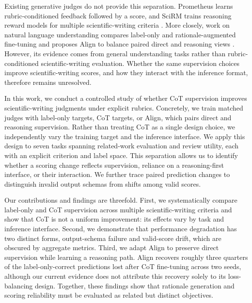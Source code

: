Existing generative judges do not provide this separation. Prometheus learns
rubric-conditioned feedback followed by a score, and SciRM trains reasoning
reward models for multiple scientific-writing criteria
\citep{kim-etal-2024-prometheus-iclr,sahinuc-etal-2026-reward}. More closely,
work on natural language understanding compares label-only and
rationale-augmented fine-tuning and proposes Align to balance paired direct and
reasoning views \citep{shi-etal-2025-rationales-nlu}. However, its evidence
comes from general understanding tasks rather than rubric-conditioned
scientific-writing evaluation. Whether the same supervision choices improve
scientific-writing scores, and how they interact with the inference format,
therefore remains unresolved.

In this work, we conduct a controlled study of whether CoT supervision improves
scientific-writing judgments under explicit rubrics. Concretely, we train
matched
judges with label-only targets, CoT targets, or Align, which pairs direct and
reasoning supervision. Rather than treating CoT as a single design choice, we
independently vary the training target and the inference interface. We apply
this design to seven tasks spanning related-work evaluation and review utility,
each with an explicit criterion and label space. This separation allows us to
identify whether a scoring change reflects supervision, reliance on a
reasoning-first interface, or their interaction. We further trace paired
prediction changes to distinguish invalid output schemas from shifts among
valid scores.

Our contributions and findings are threefold. First, we systematically compare
label-only and CoT supervision across multiple scientific-writing criteria and
show that CoT is not a uniform improvement: its effects vary by task and
inference interface. Second, we demonstrate that performance degradation has
two distinct forms, output-schema failure and valid-score drift, which are
obscured by aggregate metrics. Third, we adapt Align to preserve direct
supervision while learning a reasoning path. Align recovers roughly three
quarters of the label-only-correct predictions lost after CoT fine-tuning
across two seeds, although our current evidence does not attribute this
recovery solely to its loss-balancing design. Together, these findings show
that rationale generation and scoring reliability must be evaluated as
related but distinct objectives.
